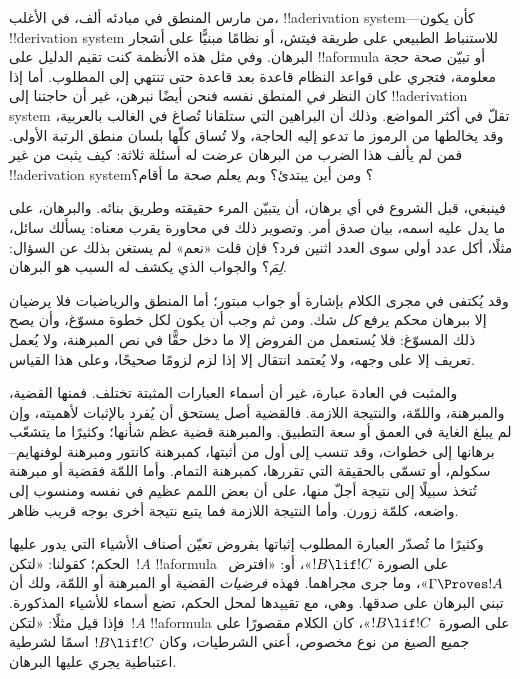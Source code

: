 \documentclass[../../../include/open-logic-section]{subfiles}
\begin{document}


من مارس المنطق في مبادئه ألف، في الأغلب، !!a{derivation}
system---كأن يكون !!{derivation} system للاستنباط الطبيعي على طريقة
فيتش، أو نظامًا مبنيًّا على أشجار البرهان. وفي مثل هذه الأنظمة كنت
تقيم الدليل على !!a{formula} أو تبيّن صحة حجة معلومة، فتجري على قواعد
النظام قاعدة بعد قاعدة حتى تنتهي إلى المطلوب. أما إذا كان النظر
\emph{في} المنطق نفسه فنحن أيضًا نبرهن، غير أن حاجتنا إلى
!!a{derivation} system تقلّ في أكثر المواضع. وذلك أن البراهين التي
ستلقانا تُصاغ في الغالب بالعربية، وقد يخالطها من الرموز ما تدعو إليه
الحاجة، ولا تُساق كلّها بلسان منطق الرتبة الأولى. فمن لم يألف هذا
الضرب من البرهان عرضت له أسئلة ثلاثة: كيف يثبت من غير
!!a{derivation} system؟ ومن أين يبتدئ؟ وبم يعلم صحة ما أقام؟

فينبغي، قبل الشروع في أي برهان، أن يتبيّن المرء حقيقته وطريق بنائه.
والبرهان، على ما يدل عليه اسمه، بيان صدق أمر. وتصوير ذلك في محاورة
يقرب معناه: يسألك سائل، مثلًا، أكل عدد أولي سوى العدد اثنين فرد؟ فإن
قلت «نعم» لم يستغن بذلك عن السؤال: \emph{لِمَ}؟ والجواب الذي يكشف له
السبب هو البرهان.

وقد يُكتفى في مجرى الكلام بإشارة أو جواب مبتور؛ أما المنطق والرياضيات
فلا يرضيان إلا ببرهان محكم يرفع \emph{كل} شك. ومن ثم وجب أن يكون لكل
خطوة مسوّغ، وأن يصح ذلك المسوّغ: فلا يُستعمل من الفروض إلا ما دخل
حقًّا في نص المبرهنة، ولا يُعمل تعريف إلا على وجهه، ولا يُعتمد انتقال
إلا إذا لزم لزومًا صحيحًا، وعلى هذا القياس.

والمثبت في العادة عبارة، غير أن أسماء العبارات المثبتة تختلف. فمنها
القضية، والمبرهنة، واللمّة، والنتيجة اللازمة. فالقضية أصل يستحق أن
يُفرد بالإثبات لأهميته، وإن لم يبلغ الغاية في العمق أو سعة التطبيق.
والمبرهنة قضية عظم شأنها؛ وكثيرًا ما يتشعّب برهانها إلى خطوات، وقد
تنسب إلى أول من أثبتها، كمبرهنة كانتور ومبرهنة لوفنهايم--سكولم، أو
تسمّى بالحقيقة التي تقررها، كمبرهنة التمام. وأما اللمّة فقضية أو
مبرهنة تُتخذ سبيلًا إلى نتيجة أجلّ منها، على أن بعض اللمم عظيم في
نفسه ومنسوب إلى واضعه، كلمّة زورن. وأما النتيجة اللازمة فما يتبع
نتيجة أخرى بوجه قريب ظاهر.

وكثيرًا ما تُصدّر العبارة المطلوب إثباتها بفروض تعيّن أصناف الأشياء
التي يدور عليها الحكم؛ كقولنا: «لتكن~$!A$ !!a{formula} على الصورة
$!B \lif !C$»، أو: «افترض~$\Gamma \Proves !A$»، وما جرى مجراهما.
فهذه \emph{فرضيات} القضية أو المبرهنة أو اللمّة، ولك أن تبني البرهان
على صدقها. وهي، مع تقييدها لمحل الحكم، تضع أسماء للأشياء المذكورة.
فإذا قيل مثلًا: «لتكن~$!A$ !!a{formula} على الصورة~$!B \lif !C$»،
كان الكلام مقصورًا على جميع الصيغ من نوع مخصوص، أعني الشرطيات، وكان
$!B \lif !C$ اسمًا لشرطية اعتباطية يجري عليها البرهان.
\end{document}
